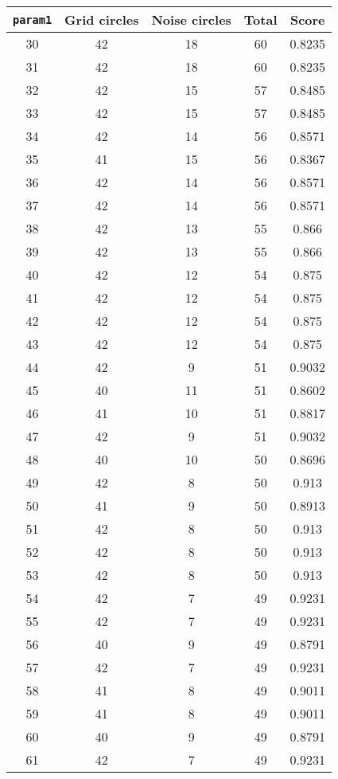 \documentclass[letterpaper, 12pt]{article}
\begin{document}
\begin{longtable}{|c|c|c|c|c|}
\hline
\textbf{\texttt{param1}} & \textbf{Grid circles} & \textbf{Noise circles} & \textbf{Total} & \textbf{Score} \\
\hline
30 & 42 & 18 & 60 & 0.8235 \\
\hline
31 & 42 & 18 & 60 & 0.8235 \\
\hline
32 & 42 & 15 & 57 & 0.8485 \\
\hline
33 & 42 & 15 & 57 & 0.8485 \\
\hline
34 & 42 & 14 & 56 & 0.8571 \\
\hline
35 & 41 & 15 & 56 & 0.8367 \\
\hline
36 & 42 & 14 & 56 & 0.8571 \\
\hline
37 & 42 & 14 & 56 & 0.8571 \\
\hline
38 & 42 & 13 & 55 & 0.866 \\
\hline
39 & 42 & 13 & 55 & 0.866 \\
\hline
40 & 42 & 12 & 54 & 0.875 \\
\hline
41 & 42 & 12 & 54 & 0.875 \\
\hline
42 & 42 & 12 & 54 & 0.875 \\
\hline
43 & 42 & 12 & 54 & 0.875 \\
\hline
44 & 42 & 9 & 51 & 0.9032 \\
\hline
45 & 40 & 11 & 51 & 0.8602 \\
\hline
46 & 41 & 10 & 51 & 0.8817 \\
\hline
47 & 42 & 9 & 51 & 0.9032 \\
\hline
48 & 40 & 10 & 50 & 0.8696 \\
\hline
49 & 42 & 8 & 50 & 0.913 \\
\hline
50 & 41 & 9 & 50 & 0.8913 \\
\hline
51 & 42 & 8 & 50 & 0.913 \\
\hline
52 & 42 & 8 & 50 & 0.913 \\
\hline
53 & 42 & 8 & 50 & 0.913 \\
\hline
54 & 42 & 7 & 49 & 0.9231 \\
\hline
55 & 42 & 7 & 49 & 0.9231 \\
\hline
56 & 40 & 9 & 49 & 0.8791 \\
\hline
57 & 42 & 7 & 49 & 0.9231 \\
\hline
58 & 41 & 8 & 49 & 0.9011 \\
\hline
59 & 41 & 8 & 49 & 0.9011 \\
\hline
60 & 40 & 9 & 49 & 0.8791 \\
\hline
61 & 42 & 7 & 49 & 0.9231 \\

\end{longtable}
\end{document}
